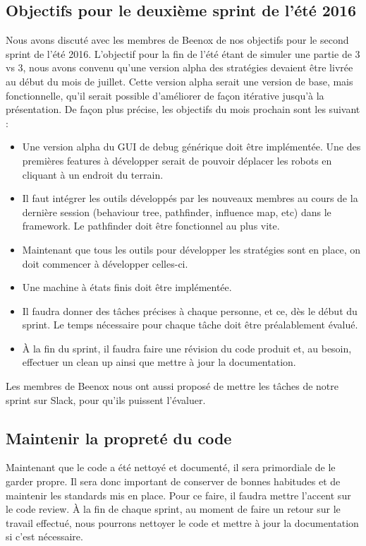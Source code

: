 \documentclass[12pt,letterpaper,twoside]{article}
\begin{document}
\subsection*{Objectifs pour le deuxième sprint de l'été 2016}
Nous avons discuté avec les membres de Beenox de nos objectifs pour le second sprint de l'été 2016. L'objectif pour la fin de l'été étant de simuler une partie de 3 vs 3, nous avons convenu qu'une version alpha des stratégies devaient être livrée au début du mois de juillet. Cette version alpha serait une version de base, mais fonctionnelle, qu'il serait possible d'améliorer de façon itérative jusqu'à la présentation. De façon plus précise, les objectifs du mois prochain sont les suivant :
\begin{itemize}
	\item Une version alpha du GUI de debug générique doit être implémentée. Une des premières features à développer serait de pouvoir déplacer les robots en cliquant à un endroit du terrain.
	\item Il faut intégrer les outils développés par les nouveaux membres au cours de la dernière session (behaviour tree, pathfinder, influence map, etc) dans le framework. Le pathfinder doit être fonctionnel au plus vite.
	\item Maintenant que tous les outils pour développer les stratégies sont en place, on doit commencer à développer celles-ci.
	\item Une machine à états finis doit être implémentée.
	\item Il faudra donner des tâches précises à chaque personne, et ce, dès le début du sprint. Le temps nécessaire pour chaque tâche doit être préalablement évalué.
	\item À la fin du sprint, il faudra faire une révision du code produit et, au besoin, effectuer un clean up ainsi que mettre à jour la documentation.
\end{itemize}
Les membres de Beenox nous ont aussi proposé de mettre les tâches de notre sprint sur Slack, pour qu'ils puissent l'évaluer.

\subsection*{Maintenir la propreté du code}
Maintenant que le code a été nettoyé et documenté, il sera primordiale de le garder propre. Il sera donc important de conserver de bonnes habitudes et de maintenir les standards mis en place. Pour ce faire, il faudra mettre l'accent sur le code review. À la fin de chaque sprint, au moment de faire un retour sur le travail effectué, nous pourrons nettoyer le code et mettre à jour la documentation si c'est nécessaire.
\end{document}
